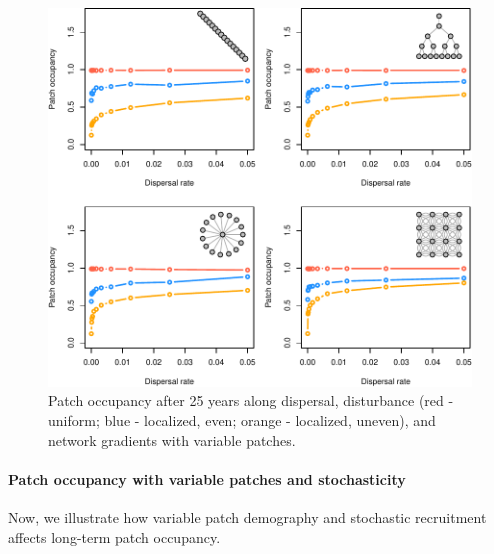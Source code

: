 \documentclass[
]{article}
\begin{document}
\begin{figure}[H]

{\centering \includegraphics{Managing_for_ecological_surprises_in_metapopulations_files/figure-latex/patch occupancy with variable patches-1} 

}

\caption{Patch occupancy after 25 years along  dispersal, disturbance (red - uniform; blue - localized, even; orange - localized, uneven), and network gradients with variable patches.}\label{fig:patch occupancy with variable patches}
\end{figure}
\newpage

\hypertarget{patch-occupancy-with-variable-patches-and-stochasticity}{%
\paragraph{Patch occupancy with variable patches and
stochasticity}\label{patch-occupancy-with-variable-patches-and-stochasticity}}

Now, we illustrate how variable patch demography and stochastic
recruitment affects long-term patch occupancy.
\end{document}
